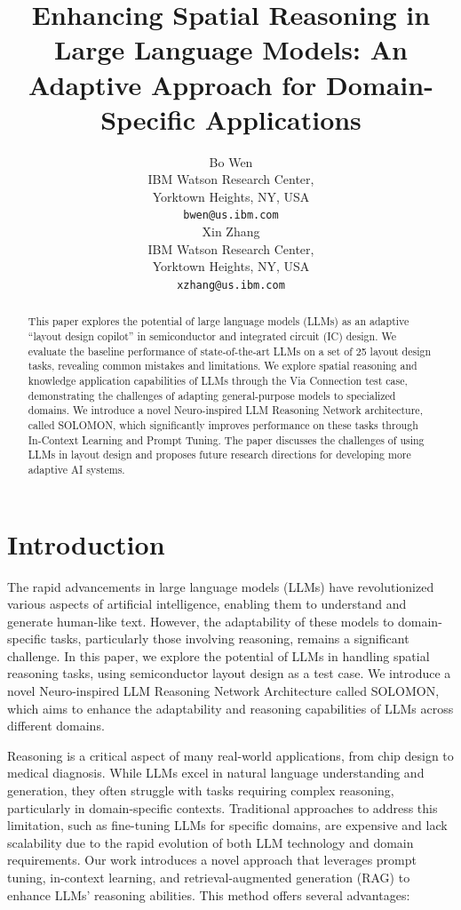 \documentclass{article}
\title{Enhancing Spatial Reasoning in Large Language Models: An Adaptive Approach for Domain-Specific Applications}
\author{%
  Bo Wen\\
  IBM Watson Research Center, \\
  Yorktown Heights, NY, USA \\
  \texttt{bwen@us.ibm.com} \\
  \And
  Xin Zhang\\
  IBM Watson Research Center, \\
  Yorktown Heights, NY, USA \\
  \texttt{xzhang@us.ibm.com} \\
}
\begin{document}
\maketitle

\begin{abstract}
  This paper explores the potential of large language models (LLMs) as an adaptive ``layout design copilot'' in semiconductor and integrated circuit (IC) design. We evaluate the baseline performance of state-of-the-art LLMs on a set of 25 layout design tasks, revealing common mistakes and limitations. We explore spatial reasoning and knowledge application capabilities of LLMs through the Via Connection test case, demonstrating the challenges of adapting general-purpose models to specialized domains. We introduce a novel Neuro-inspired LLM Reasoning Network architecture, called SOLOMON, which significantly improves performance on these tasks through In-Context Learning and Prompt Tuning. The paper discusses the challenges of using LLMs in layout design and proposes future research directions for developing more adaptive AI systems.
\end{abstract}

\section{Introduction}
The rapid advancements in large language models (LLMs) have revolutionized various aspects of artificial intelligence, enabling them to understand and generate human-like text. However, the adaptability of these models to domain-specific tasks, particularly those involving reasoning, remains a significant challenge. In this paper, we explore the potential of LLMs in handling spatial reasoning tasks, using semiconductor layout design as a test case. We introduce a novel Neuro-inspired LLM Reasoning Network Architecture called SOLOMON, which aims to enhance the adaptability and reasoning capabilities of LLMs across different domains.

Reasoning is a critical aspect of many real-world applications, from chip design to medical diagnosis. While LLMs excel in natural language understanding and generation, they often struggle with tasks requiring complex reasoning, particularly in domain-specific contexts. Traditional approaches to address this limitation, such as fine-tuning LLMs for specific domains, are expensive and lack scalability due to the rapid evolution of both LLM technology and domain requirements. Our work introduces a novel approach that leverages prompt tuning, in-context learning, and retrieval-augmented generation (RAG) to enhance LLMs' reasoning abilities. This method offers several advantages:
\end{document}
